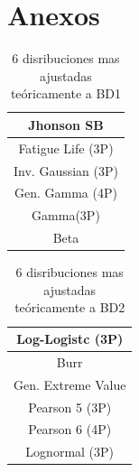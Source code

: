 \documentclass[12pt]{report}
\begin{document}
\appendix
\chapter{Anexos}
\begin{table}[h!]
	\centering
	\begin{tabular}{|c|}
		\hline
		   Jhonson SB    \\
		\hline
		Fatigue Life (3P)      \\ \hline
		Inv. Gaussian (3P)      \\ \hline 
		Gen. Gamma (4P)    \\ \hline
		Gamma(3P)     \\ \hline
		Beta     \\ \hline
		\hline
	\end{tabular}
	\caption{6 disribuciones mas ajustadas teóricamente a BD1}
	\label{teo_BD1}
\end{table}


\begin{table}[h!]
	\centering
	\begin{tabular}{|c|}
		\hline
		Log-Logistc (3P)   \\
		\hline
		Burr      \\ \hline
		Gen. Extreme Value  \\ \hline 
		Pearson 5 (3P)    \\ \hline
		Pearson 6 (4P)    \\ \hline
		Lognormal (3P)   \\ \hline
		\hline
	\end{tabular}
	\caption{6 disribuciones mas ajustadas teóricamente a BD2}
	\label{teo_BD2}
\end{table}
\end{document}
